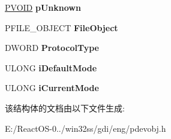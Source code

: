 \begin{DoxyCompactItemize}
\mbox{\label{struct___g_r_a_p_h_i_c_s___d_e_v_i_c_e_a2c62edbd22440bd34181ec34527dbbb7}} 
\hyperlink{interfacevoid}{P\+V\+O\+ID} {\bfseries p\+Unknown}
\item 
\mbox{\label{struct___g_r_a_p_h_i_c_s___d_e_v_i_c_e_a9cce66f2ac89508c4ee7e597b7a815b7}} 
P\+F\+I\+L\+E\+\_\+\+O\+B\+J\+E\+CT {\bfseries File\+Object}
\item 
\mbox{\label{struct___g_r_a_p_h_i_c_s___d_e_v_i_c_e_adb3cb89fbaf1575f298b459deba035e8}} 
D\+W\+O\+RD {\bfseries Protocol\+Type}
\item 
\mbox{\label{struct___g_r_a_p_h_i_c_s___d_e_v_i_c_e_ad997300c3c5d02075e1b6aeb07b73f7f}} 
U\+L\+O\+NG {\bfseries i\+Default\+Mode}
\item 
\mbox{\label{struct___g_r_a_p_h_i_c_s___d_e_v_i_c_e_a205ed5eefeca4b7f6fecf34a4b421e74}} 
U\+L\+O\+NG {\bfseries i\+Current\+Mode}
\end{DoxyCompactItemize}


该结构体的文档由以下文件生成\+:\begin{DoxyCompactItemize}
\item 
E\+:/\+React\+O\+S-\/0../win32ss/gdi/eng/pdevobj.\+h\end{DoxyCompactItemize}
